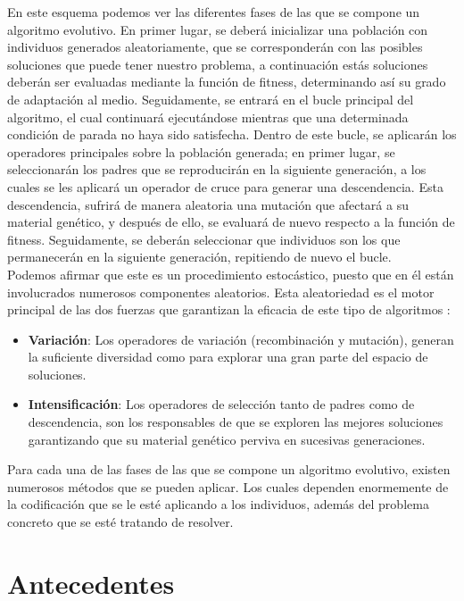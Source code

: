 En este esquema podemos ver las diferentes fases de las que se compone un algoritmo evolutivo. En primer lugar, se deberá inicializar una población con individuos generados aleatoriamente, que se corresponderán con las posibles soluciones que puede tener nuestro problema, a continuación estás soluciones deberán ser evaluadas mediante la función de fitness, determinando así su grado de adaptación al medio. Seguidamente, se entrará en el bucle principal del algoritmo, el cual continuará ejecutándose mientras que una determinada condición de parada no haya sido satisfecha. Dentro de este bucle, se aplicarán los operadores principales sobre la población generada; en primer lugar, se seleccionarán los padres que se reproducirán en la siguiente generación, a los cuales se les aplicará un operador de cruce para generar una descendencia. Esta descendencia, sufrirá de manera aleatoria una mutación que afectará a su material genético, y después de ello, se evaluará de nuevo respecto a la función de fitness. Seguidamente, se deberán seleccionar que individuos son los que permanecerán en la siguiente generación, repitiendo de nuevo el bucle. \\ 

Podemos afirmar que este es un procedimiento estocástico, puesto que en él están involucrados numerosos componentes aleatorios. Esta aleatoriedad es el motor principal de las dos fuerzas que garantizan la eficacia de este tipo de algoritmos \cite{eiben2003introduction}:

\begin{itemize}
    \item \textbf{Variación}: Los operadores de variación (recombinación y mutación), generan la suficiente diversidad como para explorar una gran parte del espacio de soluciones.
    \item \textbf{Intensificación}: Los operadores de selección tanto de padres como de descendencia, son los responsables de que se exploren las mejores soluciones garantizando que su material genético perviva en sucesivas generaciones.
\end{itemize}

Para cada una de las fases de las que se compone un algoritmo evolutivo, existen numerosos métodos que se pueden aplicar. Los cuales dependen enormemente de la codificación que se le esté aplicando a los individuos, además del problema concreto que se esté tratando de resolver.

\section{Antecedentes}
\label{1:sec:4}

